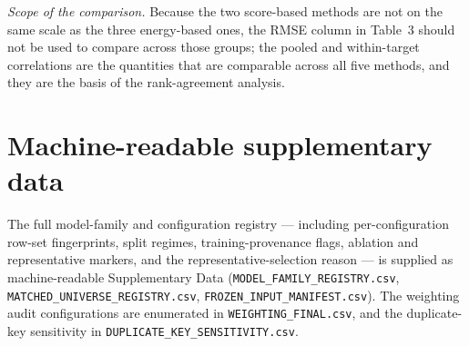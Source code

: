 \documentclass[11pt,a4paper]{article}
\begin{document}
\emph{Scope of the comparison.} Because the two score-based methods are not on the same scale
as the three energy-based ones, the RMSE column in Table~3 should not be used to compare across
those groups; the pooled and within-target correlations are the quantities that are comparable
across all five methods, and they are the basis of the rank-agreement analysis.


\section*{Machine-readable supplementary data}
The full model-family and configuration registry --- including per-configuration row-set
fingerprints, split regimes, training-provenance flags, ablation and representative markers,
and the representative-selection reason --- is supplied as machine-readable Supplementary
Data (\texttt{MODEL\_FAMILY\_REGISTRY.csv}, \texttt{MATCHED\_UNIVERSE\_REGISTRY.csv},
\texttt{FROZEN\_INPUT\_MANIFEST.csv}). The weighting audit configurations are enumerated in
\texttt{WEIGHTING\_FINAL.csv}, and the duplicate-key sensitivity in
\texttt{DUPLICATE\_KEY\_SENSITIVITY.csv}.
\end{document}

